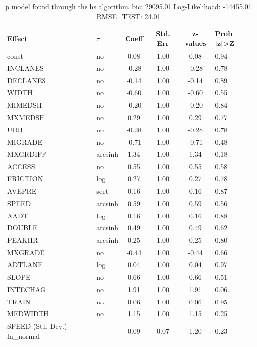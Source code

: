 \begin{table}
	\caption{p model found through the hs algorithm. bic: 29095.01 Log-Likelihood: -14455.01 RMSE_TEST: 24.01}
	\begin{center}
		\begin{tabular}{|l|l|c|c|c|l|}
			\hline
			Effect & $\tau$ & Coeff & Std. Err & z-values & Prob |z|>Z \\
			\hline
			const & no & 0.08 & 1.00 & 0.08 & 0.94 \\
			\hline
			INCLANES & no & -0.28 & 1.00 & -0.28 & 0.78 \\
			\hline
			DECLANES & no & -0.14 & 1.00 & -0.14 & 0.89 \\
			\hline
			WIDTH & no & -0.60 & 1.00 & -0.60 & 0.55 \\
			\hline
			MIMEDSH & no & -0.20 & 1.00 & -0.20 & 0.84 \\
			\hline
			MXMEDSH & no & 0.29 & 1.00 & 0.29 & 0.77 \\
			\hline
			URB & no & -0.28 & 1.00 & -0.28 & 0.78 \\
			\hline
			MIGRADE & no & -0.71 & 1.00 & -0.71 & 0.48 \\
			\hline
			MXGRDIFF & arcsinh & 1.34 & 1.00 & 1.34 & 0.18 \\
			\hline
			ACCESS & no & 0.55 & 1.00 & 0.55 & 0.58 \\
			\hline
			FRICTION & log & 0.27 & 1.00 & 0.27 & 0.78 \\
			\hline
			AVEPRE & sqrt & 0.16 & 1.00 & 0.16 & 0.87 \\
			\hline
			SPEED & arcsinh & 0.59 & 1.00 & 0.59 & 0.56 \\
			\hline
			AADT & log & 0.16 & 1.00 & 0.16 & 0.88 \\
			\hline
			DOUBLE & arcsinh & 0.49 & 1.00 & 0.49 & 0.62 \\
			\hline
			PEAKHR & arcsinh & 0.25 & 1.00 & 0.25 & 0.80 \\
			\hline
			MXGRADE & no & -0.44 & 1.00 & -0.44 & 0.66 \\
			\hline
			ADTLANE & log & 0.04 & 1.00 & 0.04 & 0.97 \\
			\hline
			SLOPE & no & 0.66 & 1.00 & 0.66 & 0.51 \\
			\hline
			INTECHAG & no & 1.91 & 1.00 & 1.91 & 0.06. \\
			\hline
			TRAIN & no & 0.06 & 1.00 & 0.06 & 0.95 \\
			\hline
			MEDWIDTH & no & 1.15 & 1.00 & 1.15 & 0.25 \\
			\hline
			SPEED (Std. Dev.) ln_normal &  & 0.09 & 0.07 & 1.20 & 0.23 \\

\end{tabular}
\end{center}
\end{table}

